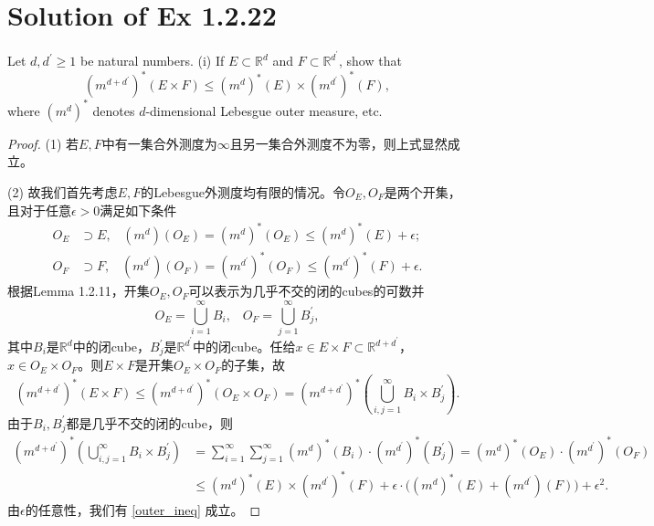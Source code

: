 \documentclass[reqno,a4paper,14pt]{amsart}
\begin{document}
\section{Solution of Ex 1.2.22}
Let $d,d^\prime\geq 1$ be natural numbers. (i) If $E\subset \mathbb{R}^d$ and $F\subset \mathbb{R}^{d^\prime}$, show that 
\begin{equation}
    (m^{d+d^\prime})^*(E\times F)\leq (m^d)^*(E)\times (m^{d^\prime})^*(F),
    \label{outer_ineq}
\end{equation}
where $(m^d)^*$ denotes $d$-dimensional Lebesgue outer measure, etc.      
\begin{proof}
    (1) 若$E,F$中有一集合外测度为$\infty$且另一集合外测度不为零，则上式显然成立。
    
    (2) 故我们首先考虑$E,F$的Lebesgue外测度均有限的情况。令$O_E,O_F$是两个开集，且对于任意$\epsilon>0$满足如下条件
    \begin{equation*}
        \begin{split}
            O_E&\supset E,\;\;\; (m^d)(O_E)=(m^d)^*(O_E)\leq (m^d)^*(E)+\epsilon;\\
            O_F&\supset F,\;\;\; (m^{d^\prime})(O_F)=(m^{d^\prime})^*(O_F)\leq (m^{d^\prime})^*(F)+\epsilon.
        \end{split}
    \end{equation*}
    根据Lemma 1.2.11，开集$O_E,O_F$可以表示为几乎不交的闭的cubes的可数并
    \begin{equation*}
        O_E=\bigcup_{i=1}^\infty B_i,\;\;\; O_F=\bigcup_{j=1}^\infty B^\prime_j,
    \end{equation*}
    其中$B_i$是$\mathbb{R}^d$中的闭cube，$B^\prime_j$是$\mathbb{R}^{d^\prime}$中的闭cube。任给$x\in E\times F\subset \mathbb{R}^{d+d^\prime}$，$x\in O_E\times O_F$。则$E\times F$是开集$O_E\times O_F$的子集，故
    \begin{equation*}
        (m^{d+d^\prime})^*(E\times F)\leq (m^{d+d^\prime})^*(O_E\times O_F)=(m^{d+d^\prime})^*(\bigcup_{i,j=1}^\infty B_i\times B^\prime_j).
    \end{equation*}
    由于$B_i,B^{\prime}_j$都是几乎不交的闭的cube，则
    \begin{equation*}
        \begin{split}
            (m^{d+d^\prime})^*(\bigcup_{i,j=1}^\infty B_i\times B^\prime_j)&=\sum_{i=1}^\infty \sum_{j=1}^\infty (m^d)^*(B_i)\cdot (m^{d^\prime})^*(B^\prime_j)=(m^d)^*(O_E)\cdot (m^{d^\prime})^*(O_F)\\
            &\leq (m^d)^*(E)\times (m^{d^\prime})^*(F)+\epsilon\cdot\bigl((m^d)^*(E)+(m^{d^\prime})(F)\bigr)+\epsilon^2.
        \end{split}
    \end{equation*}
    由$\epsilon$的任意性，我们有 \eqref{outer_ineq} 成立。
    

\end{proof}
\end{document}
